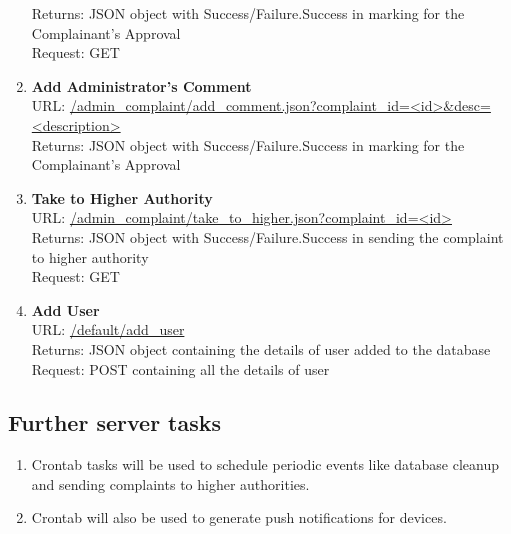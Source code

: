 \documentclass{article}
\begin{document}
\begin{enumerate}
						Returns: JSON object with Success/Failure.Success in marking for the Complainant's Approval\\
						Request: GET 
					\item \textbf{Add Administrator's Comment} \\ 
						URL: \url{/admin_complaint/add_comment.json?complaint_id=<id>&desc=<description>}\\
						Returns: JSON object with Success/Failure.Success in marking for the Complainant's Approval
					\item \textbf{Take to Higher Authority} \\ 
						URL: \url{/admin_complaint/take_to_higher.json?complaint_id=<id>}\\
						Returns: JSON object with Success/Failure.Success in sending the complaint to higher authority\\
						Request: GET 
					\item \textbf{Add User} \\ 
						URL: \url{/default/add_user}\\
						Returns: JSON object containing the details of user added to the database
						Request: POST containing all the details of user 
				\end{enumerate}
			\subsection{Further server tasks}
				\begin{enumerate}
					\item Crontab tasks will be used to schedule periodic events like database cleanup and sending complaints to higher authorities.
					\item Crontab will also be used to generate push notifications for devices.
				\end{enumerate}
			
\end{document}
